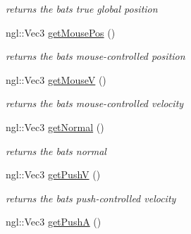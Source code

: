 \begin{DoxyCompactItemize}
\begin{DoxyCompactList}\small\item\em returns the bat\textquotesingle{}s true global position \end{DoxyCompactList}\item 
\hypertarget{class_bat_a84a84c1eaa37f6221282953f93e5b3d8}{}ngl\+::\+Vec3 \hyperlink{class_bat_a84a84c1eaa37f6221282953f93e5b3d8}{get\+Mouse\+Pos} ()\label{class_bat_a84a84c1eaa37f6221282953f93e5b3d8}

\begin{DoxyCompactList}\small\item\em returns the bat\textquotesingle{}s mouse-\/controlled position \end{DoxyCompactList}\item 
\hypertarget{class_bat_a5d2038c9c42d793441795a15c0b0ffce}{}ngl\+::\+Vec3 \hyperlink{class_bat_a5d2038c9c42d793441795a15c0b0ffce}{get\+Mouse\+V} ()\label{class_bat_a5d2038c9c42d793441795a15c0b0ffce}

\begin{DoxyCompactList}\small\item\em returns the bat\textquotesingle{}s mouse-\/controlled velocity \end{DoxyCompactList}\item 
\hypertarget{class_bat_a552c9c5dc6e2fb8e1b3b3ab180d80605}{}ngl\+::\+Vec3 \hyperlink{class_bat_a552c9c5dc6e2fb8e1b3b3ab180d80605}{get\+Normal} ()\label{class_bat_a552c9c5dc6e2fb8e1b3b3ab180d80605}

\begin{DoxyCompactList}\small\item\em returns the bat\textquotesingle{}s normal \end{DoxyCompactList}\item 
\hypertarget{class_bat_a29a52a25985df48a46eca5079e354853}{}ngl\+::\+Vec3 \hyperlink{class_bat_a29a52a25985df48a46eca5079e354853}{get\+Push\+V} ()\label{class_bat_a29a52a25985df48a46eca5079e354853}

\begin{DoxyCompactList}\small\item\em returns the bat\textquotesingle{}s push-\/controlled velocity \end{DoxyCompactList}\item 
\hypertarget{class_bat_afe01a9ede9e614596f408c894e03ca5a}{}ngl\+::\+Vec3 \hyperlink{class_bat_afe01a9ede9e614596f408c894e03ca5a}{get\+Push\+A} ()\label{class_bat_afe01a9ede9e614596f408c894e03ca5a}


\end{DoxyCompactItemize}
